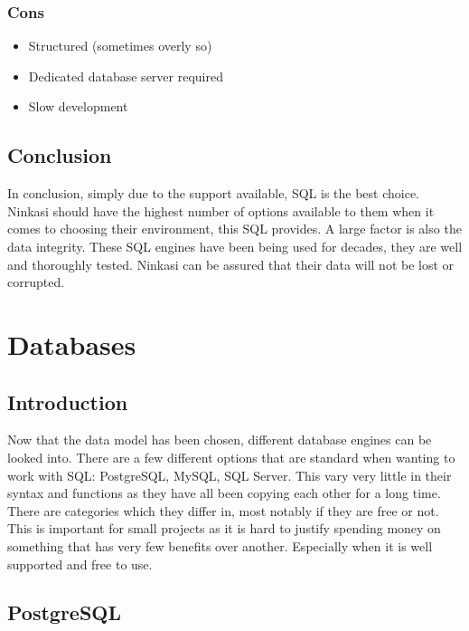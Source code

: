 \documentclass[draftclsnofoot,onecolumn,journal,letterpaper,compsoc,10pt]{IEEEtran}
\begin{document}
        \subsubsection{Cons}
        \begin{itemize}
            \item Structured (sometimes overly so)
            \item Dedicated database server required
            \item Slow development
        \end{itemize}
    
    \subsection{Conclusion}

    In conclusion, simply due to the support available, SQL is the best choice.  Ninkasi should have the highest number of options available to them when it comes to choosing their environment, this SQL provides.  A large factor is also the data integrity.  These SQL engines have been being used for decades, they are well and thoroughly tested.  Ninkasi can be assured that their data will not be lost or corrupted.

\section{Databases}

    \subsection{Introduction}
    
    Now that the data model has been chosen, different database engines can be looked into.  There are a few different options that are standard when wanting to work with SQL: PostgreSQL, MySQL, SQL Server.  This vary very little in their syntax and functions as they have all been copying each other for a long time.  There are categories which they differ in, most notably if they are free or not.  This is important for small projects as it is hard to justify spending money on something that has very few benefits over another.  Especially when it is well supported and free to use.
    
    \subsection{PostgreSQL}
    
\end{document}

